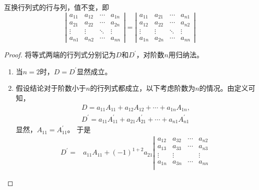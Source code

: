 \documentclass[10pt,a4paper%
tablecaptionabove]{article}
\begin{document}
\begin{CJK}{UTF8}{gkai}
  \begin{xingzhi}
    互换行列式的行与列，值不变，即
    \begin{equation}
      \left|
        \begin{array}{cccc}
          a_{11}  &  a_{12} & \cdots & a_{1n} \\
          a_{21}  &  a_{22} & \cdots & a_{2n} \\
          \vdots & \vdots & \ddots & \vdots\\  
          a_{n1}  &  a_{n2} & \cdots & a_{nn} 
        \end{array}
      \right|
      =
      \left|
        \begin{array}{cccc}
          a_{11}  &  a_{21} & \cdots & a_{n1} \\
          a_{12}  &  a_{22} & \cdots & a_{n2} \\
          \vdots & \vdots & \ddots & \vdots\\  
          a_{1n}  &  a_{2n} & \cdots & a_{nn} 
        \end{array}
      \right|
    \end{equation}
  \end{xingzhi}
  \begin{proof}
    将等式两端的行列式分别记为$D$和$D^\prime$，对阶数$n$用归纳法。
    \begin{enumerate}
    \item 当$n=2$时，$D=D^\prime$显然成立。 
    \item 假设结论对于阶数小于$n$的行列式都成立，以下考虑阶数为$n$的情况。由定义可知，
      $$
      \begin{array}{c}
        D = a_{11} A_{11}+a_{12}A_{12}+\cdots+a_{1n}A_{1n}, \\[0.1in]
        D^\prime = a_{11} A^\prime_{11}+a_{21}A^\prime_{21}+\cdots+a_{n1}A^\prime_{n1}
      \end{array}
      $$
      显然，$A_{11}=A^\prime_{11}$。
      于是
      $$
      \begin{aligned}
        D^\prime =&
        a_{11} A_{11}+(-1)^{1+2}a_{21}
        \left|
          \begin{array}{cccc}
            a_{12} & a_{32} & \cdots & a_{n2} \\
            a_{13} & a_{33} & \cdots & a_{n3} \\
            \vdots & \vdots & & \vdots \\
            a_{1n} & a_{3n} & \cdots & a_{nn} \\
          \end{array}

\end{aligned}$$
\end{enumerate}
\end{proof}
\end{CJK}
\end{document}
